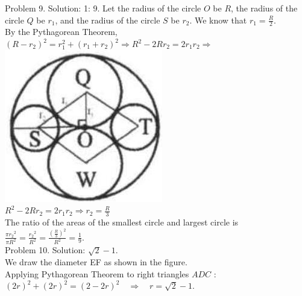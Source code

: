 \documentclass[10pt]{article}
\begin{document}
Problem 9. Solution: 1: 9.
Let the radius of the circle \(O\) be \(R\), the radius of the circle \(Q\) be \(r_{1}\), and the radius of the circle \(S\) be \(r_{2}\). We know that \(r_{1}=\frac{R}{2}\).\\
By the Pythagorean Theorem,\\
\(\left(R-r_{2}\right)^{2}=r_{1}^{2}+\left(r_{1}+r_{2}\right)^{2} \Rightarrow R^{2}-2 R r_{2}=2 r_{1} r_{2} \Rightarrow\)\\
\includegraphics[max width=\textwidth, center]{2025_04_17_97bc1f7e44d93c271a88g-190(1)}\\
\(R^{2}-2 R r_{2}=2 r_{1} r_{2} \Rightarrow r_{2}=\frac{R}{3}\)\\
The ratio of the areas of the smallest circle and largest circle is\\
\(\frac{\pi r_{2}{ }^{2}}{\pi R^{2}}=\frac{r_{2}{ }^{2}}{R^{2}}=\frac{\left(\frac{R}{3}\right)^{2}}{R^{2}}=\frac{1}{9}\).\\
Problem 10. Solution: \(\sqrt{2}-1\).\\
We draw the diameter EF as shown in the figure.\\
Applying Pythagorean Theorem to right triangles \(A D C\) :\\
\((2 r)^{2}+(2 r)^{2}=(2-2 r)^{2} \quad \Rightarrow \quad r=\sqrt{2}-1\).\\
\end{document}
